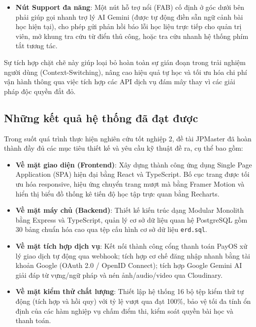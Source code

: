 \documentclass[../DoAn.tex]{subfiles}
\begin{document}
\begin{itemize}
\begin{itemize}
        \item \textbf{Nút Support đa năng}: Một nút hỗ trợ nổi (FAB) cố định ở góc dưới bên phải giúp gọi nhanh trợ lý AI Gemini (được tự động điền sẵn ngữ cảnh bài học hiện tại), cho phép gửi phản hồi báo lỗi học liệu trực tiếp cho quản trị viên, mở khung tra cứu từ điển thủ công, hoặc tra cứu nhanh hệ thống phím tắt tương tác.
    \end{itemize}
    Sự tích hợp chặt chẽ này giúp loại bỏ hoàn toàn sự gián đoạn trong trải nghiệm người dùng (Context-Switching), nâng cao hiệu quả tự học và tối ưu hóa chi phí vận hành thông qua việc tích hợp các API dịch vụ đám mây thay vì các giải pháp độc quyền đắt đỏ.
\end{itemize}


\subsection{Những kết quả hệ thống đã đạt được}
Trong suốt quá trình thực hiện nghiên cứu tốt nghiệp 2, đề tài JPMaster đã hoàn thành đầy đủ các mục tiêu thiết kế và yêu cầu kỹ thuật đề ra, cụ thể bao gồm:
\begin{itemize}
    \item \textbf{Về mặt giao diện (Frontend)}: Xây dựng thành công ứng dụng Single Page Application (SPA) hiện đại bằng React và TypeScript. Bố cục trang được tối ưu hóa responsive, hiệu ứng chuyển trang mượt mà bằng Framer Motion và hiển thị biểu đồ thống kê tiến độ học tập trực quan bằng Recharts.
    \item \textbf{Về mặt máy chủ (Backend)}: Thiết kế kiến trúc dạng Modular Monolith bằng Express và TypeScript, quản lý cơ sở dữ liệu quan hệ PostgreSQL gồm 30 bảng chuẩn hóa cao qua tệp cấu hình cơ sở dữ liệu \texttt{erd.sql}.
    \item \textbf{Về mặt tích hợp dịch vụ}: Kết nối thành công cổng thanh toán PayOS xử lý giao dịch tự động qua webhook; tích hợp cơ chế đăng nhập nhanh bằng tài khoản Google (OAuth 2.0 / OpenID Connect); tích hợp Google Gemini AI giải đáp từ vựng/ngữ pháp và nén ảnh/audio/video qua Cloudinary.
    \item \textbf{Về mặt kiểm thử chất lượng}: Thiết lập hệ thống 16 bộ tệp kiểm thử tự động (tích hợp và hồi quy) với tỷ lệ vượt qua đạt 100\%, bảo vệ tối đa tính ổn định của các hàm nghiệp vụ chấm điểm thi, kiểm soát quyền bài học và thanh toán.
\end{itemize}
\end{document}
